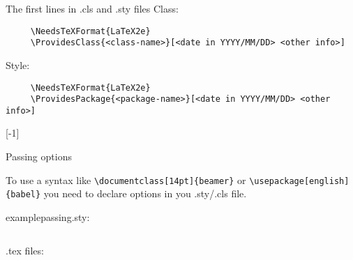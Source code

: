 \graphicspath{{sec03/images/}{sec03/code/}}
\lstset{inputpath=sec03/code/}

\begin{frame}[fragile]{The first lines in .cls and .sty files}\relax
     Class:
     \begin{verbatim}
     \NeedsTeXFormat{LaTeX2e}
     \ProvidesClass{<class-name>}[<date in YYYY/MM/DD> <other info>]
     \end{verbatim}
     
     Style:
     \begin{verbatim}
     \NeedsTeXFormat{LaTeX2e}
     \ProvidesPackage{<package-name>}[<date in YYYY/MM/DD> <other info>]
     \end{verbatim}
     
     [-1]
     
    
\end{frame}


\begin{frame}[fragile]{Passing options}\relax

    To use a syntax like \verb|\documentclass[14pt]{beamer}| or \verb|\usepackage[english]{babel}| you need to declare options in you .sty/.cls file.
    
    examplepassing.sty:
    \inputminted[fontsize=\tiny]{latex}{sec03/code/examplepassing.sty}
    
    .tex files: 

\end{frame}

